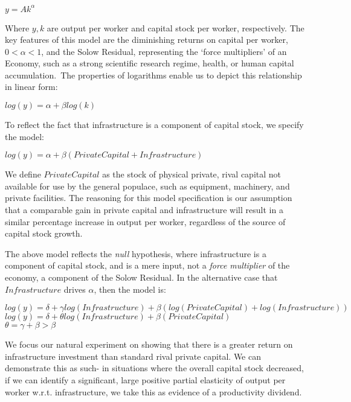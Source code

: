 \documentclass[11pt]{article}
\begin{document}
\begin{center}
 $y=Ak^\alpha$\\
\end{center}

 Where $y,k$ are output per worker and capital stock per worker, respectively. The key features of this model are the diminishing returns on capital per worker, $0<\alpha<1$, and the Solow Residual, representing the ‘force multipliers’ of an Economy, such as a strong scientific research regime, health, or human capital accumulation. The properties of logarithms enable us to depict this relationship in linear form:\\
\begin{center}
$log(y)=\alpha+\beta log(k)$\\
\end{center}
To reflect the fact that infrastructure is a component of capital stock, we specify the model: 
\begin{center}
$log(y)=\alpha+\beta(Private Capital + Infrastructure)$\\
\end{center}
We define $PrivateCapital$ as the stock of physical private, rival capital not available for use by the general populace, such as equipment, machinery, and private facilities. The reasoning for this model specification is our assumption that a comparable gain in private capital and infrastructure will result in a similar percentage increase in output per worker, regardless of the source of capital stock growth. 

The above model reflects the \textit{null} hypothesis, where infrastructure is a component of capital stock, and is a mere input, not a \textit{force multiplier} of the economy, a component of the Solow Residual. In the alternative case that $Infrastructure$ drives $\alpha$, then the model is:\\

\begin{center}
$log(y)=\delta+\gamma log(Infrastructure )+ \beta(log(PrivateCapital) + log(Infrastructure))$\\

$log(y)=\delta+\theta log(Infrastructure) + \beta( PrivateCapital)$\\

$\theta = \gamma + \beta > \beta$\\
\end{center}

We focus our natural experiment on showing that there is a greater return on infrastructure investment than standard rival private capital. We can demonstrate this as such- in situations where the overall capital stock decreased, if we can identify a significant, large positive partial elasticity of output per worker w.r.t. infrastructure, we take this as evidence of a productivity dividend. 
\end{document}
